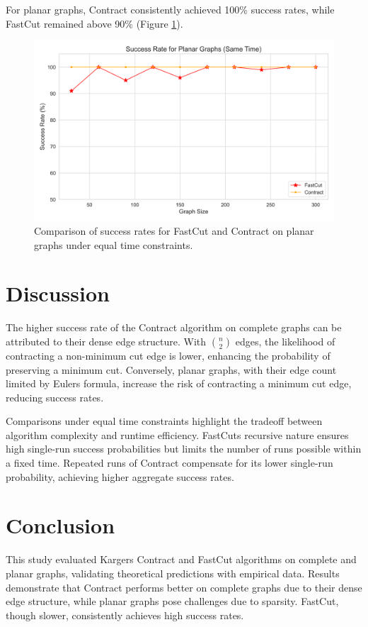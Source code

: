 \documentclass{article}
\theoremstyle{plain} %
\begin{document}
For planar graphs, Contract consistently achieved 100\% success rates, while FastCut remained above 90\% (Figure \ref{fig:planar-same-time}).

\begin{figure}[H]
    \centering
    \includegraphics[width=0.8\linewidth]{assets2//graphics/same_time_300_planar_same_time_plot.png}
    \caption{Comparison of success rates for FastCut and Contract on planar graphs under equal time constraints.}
    \label{fig:planar-same-time}
\end{figure}


\section{Discussion}
The higher success rate of the Contract algorithm on complete graphs can be attributed to their dense edge structure. With ${n \choose 2}$ edges, the likelihood of contracting a non-minimum cut edge is lower, enhancing the probability of preserving a minimum cut. Conversely, planar graphs, with their edge count limited by Euler\textquotesingle{}s formula, increase the risk of contracting a minimum cut edge, reducing success rates.

Comparisons under equal time constraints highlight the tradeoff between algorithm complexity and runtime efficiency. FastCut\textquotesingle{}s recursive nature ensures high single-run success probabilities but limits the number of runs possible within a fixed time. Repeated runs of Contract compensate for its lower single-run probability, achieving higher aggregate success rates.


\section{Conclusion}
This study evaluated Karger\textquotesingle{}s Contract and FastCut algorithms on complete and planar graphs, validating theoretical predictions with empirical data. Results demonstrate that Contract performs better on complete graphs due to their dense edge structure, while planar graphs pose challenges due to sparsity. FastCut, though slower, consistently achieves high success rates.
\end{document}
